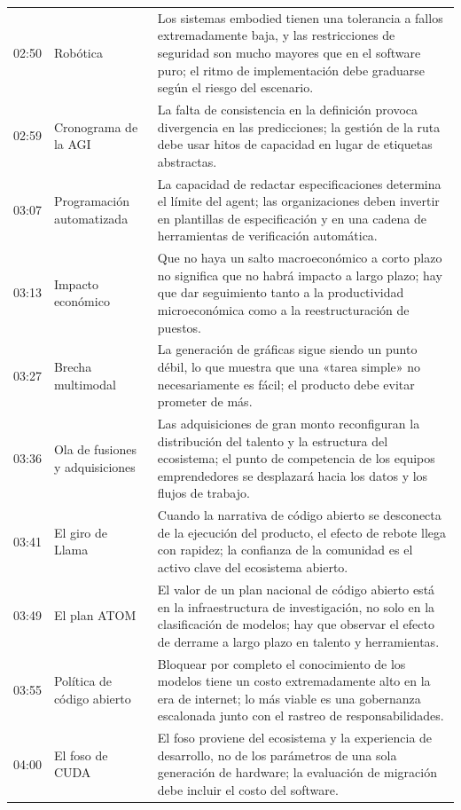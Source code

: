 \begin{longtable}{p{}p{}p{}}
02:50 & Robótica & Los sistemas embodied tienen una tolerancia a fallos extremadamente baja, y las restricciones de seguridad son mucho mayores que en el software puro; el ritmo de implementación debe graduarse según el riesgo del escenario. \\
02:59 & Cronograma de la AGI & La falta de consistencia en la definición provoca divergencia en las predicciones; la gestión de la ruta debe usar hitos de capacidad en lugar de etiquetas abstractas. \\
03:07 & Programación automatizada & La capacidad de redactar especificaciones determina el límite del agent; las organizaciones deben invertir en plantillas de especificación y en una cadena de herramientas de verificación automática. \\
03:13 & Impacto económico & Que no haya un salto macroeconómico a corto plazo no significa que no habrá impacto a largo plazo; hay que dar seguimiento tanto a la productividad microeconómica como a la reestructuración de puestos. \\
03:27 & Brecha multimodal & La generación de gráficas sigue siendo un punto débil, lo que muestra que una «tarea simple» no necesariamente es fácil; el producto debe evitar prometer de más. \\
03:36 & Ola de fusiones y adquisiciones & Las adquisiciones de gran monto reconfiguran la distribución del talento y la estructura del ecosistema; el punto de competencia de los equipos emprendedores se desplazará hacia los datos y los flujos de trabajo. \\
03:41 & El giro de Llama & Cuando la narrativa de código abierto se desconecta de la ejecución del producto, el efecto de rebote llega con rapidez; la confianza de la comunidad es el activo clave del ecosistema abierto. \\
03:49 & El plan ATOM & El valor de un plan nacional de código abierto está en la infraestructura de investigación, no solo en la clasificación de modelos; hay que observar el efecto de derrame a largo plazo en talento y herramientas. \\
03:55 & Política de código abierto & Bloquear por completo el conocimiento de los modelos tiene un costo extremadamente alto en la era de internet; lo más viable es una gobernanza escalonada junto con el rastreo de responsabilidades. \\
04:00 & El foso de CUDA & El foso proviene del ecosistema y la experiencia de desarrollo, no de los parámetros de una sola generación de hardware; la evaluación de migración debe incluir el costo del software. \\

\end{longtable}

